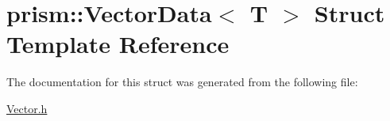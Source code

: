 \hypertarget{structprism_1_1_vector_data}{}\section{prism\+:\+:Vector\+Data$<$ T $>$ Struct Template Reference}
\label{structprism_1_1_vector_data}


The documentation for this struct was generated from the following file\+:\begin{DoxyCompactItemize}
\item 
\hyperlink{_vector_8h}{Vector.\+h}\end{DoxyCompactItemize}
